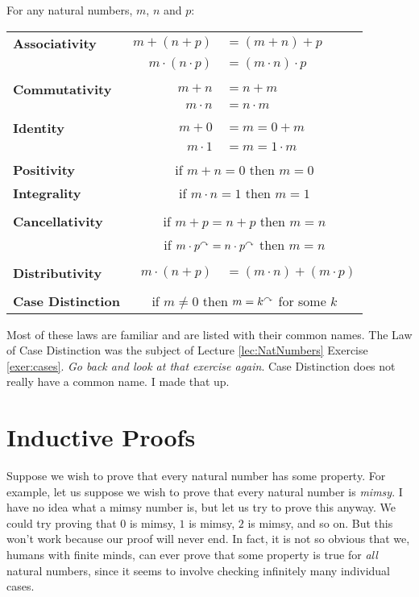 \begin{laws}
\noindent For any natural numbers, $m$, $n$ and $p$:

\begin{tabular}{lr@{\,}l}
\textbf{Associativity}& $m + (n + p)$       &$= (m+n)+p$\\
                      & $m \cdot(n\cdot p)$ &$= (m\cdot n)\cdot p$\\
&&\\                      
\textbf{Commutativity}& $m + n$             &$= n + m$\\
                      & $m\cdot n$          &$= n\cdot m$\\
&&\\ 
\textbf{Identity}     & $m + 0$             &$= m = 0 + m$\\
                      & $m\cdot 1$          &$= m = 1\cdot m$\\
&&\\
\textbf{Positivity}   &\multicolumn{2}{c}{if $m + n = 0$ then $m=0$}\\
\textbf{Integrality}  &\multicolumn{2}{c}{if $m\cdot n = 1$ then $m=1$}\\
&&\\
\textbf{Cancellativity}&\multicolumn{2}{c}{if $m + p = n+p$ then $m=n$}\\
                       &\multicolumn{2}{c}{if $m \cdot p^\curvearrowright = n\cdot p^\curvearrowright$ then $m=n$}\\
&&\\
\textbf{Distributivity}&$m\cdot(n+p)$&$= (m\cdot n) + (m\cdot p)$\\
&&\\
\textbf{Case Distinction}&\multicolumn{2}{c}{if $m\neq 0$ then $m=k^\curvearrowright$ for some $k$}\\
\end{tabular}
\end{laws}
\medskip

Most of these laws are familiar and are listed with their common names. The Law of Case
Distinction was the subject of Lecture \ref{lec:NatNumbers} Exercise \ref{exer:cases}. \emph{Go back and look at that exercise again}.
Case Distinction does not really have a common name. I made that up.

\ipadbreak

\section{Inductive Proofs}

Suppose we wish to prove that every natural number has some
property. For example, let us suppose we wish to prove that every
natural number is \emph{mimsy}.  I have no idea what a mimsy number
is, but let us try to prove this anyway. We could try proving that $0$
is mimsy, $1$ is mimsy, $2$ is mimsy, and so on.  But this won't work
because our proof will never end. In fact, it is not so obvious that
we, humans with finite minds, can ever prove that some property is
true for \emph{all} natural numbers, since it seems to involve
checking infinitely many individual cases.


